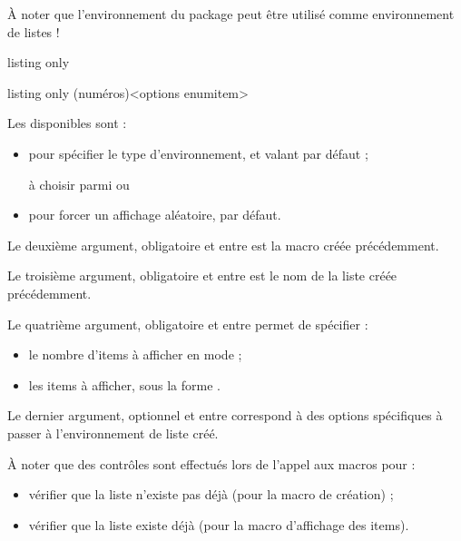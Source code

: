 \documentclass[french,11pt,a4paper]{article}
\begin{document}
À noter que l'environnement  du package peut être utilisé comme environnement de listes !

\begin{DemoCode}{listing only}
\end{DemoCode}

\begin{DemoCode}{listing only}
(numéros)<options enumitem>
\end{DemoCode}

Les  disponibles sont :

\begin{itemize}
	\item {} pour spécifier le type d'environnement, et valant  par défaut ;
	
	\hfill{}à choisir parmi   ou 
	\item {} pour forcer un affichage aléatoire,  par défaut.
\end{itemize}

Le deuxième argument, obligatoire et entre  est la macro créée précédemment.

Le troisième argument, obligatoire et entre  est le nom de la liste créée précédemment.

Le quatrième argument, obligatoire et entre  permet de spécifier :

\begin{itemize}
	\item le nombre d'items à afficher en mode  ;
	\item les items à afficher, sous la forme .
\end{itemize}

Le dernier argument, optionnel et entre  correspond à des options spécifiques à passer à l'environnement de liste  créé.

\medskip

À noter que des contrôles sont effectués lors de l'appel aux macros pour :

\begin{itemize}
	\item vérifier que la liste n'existe pas déjà (pour la macro de création) ;
	\item vérifier que la liste existe déjà (pour la macro d'affichage des items).
\end{itemize}
\end{document}
